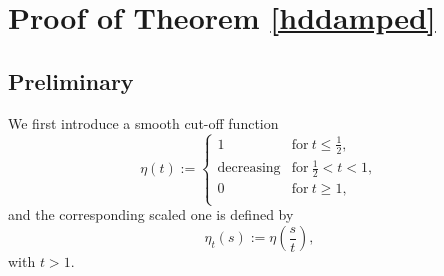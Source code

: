 \documentclass[review]{elsarticle}
\begin{document}
\section{Proof of Theorem \ref{hddamped}}
\subsection{Preliminary}
We first introduce a smooth cut-off function
\[
\eta(t):=
 \left\{
 \begin{array}{cl}
 1 & \mbox{for}\ t\le\frac12,\\
 \mbox{decreasing} & \mbox{for}\ \frac12<t<1,\\
 0 & \mbox{for}\ t\ge 1,\\
 \end{array}
 \right.
\]
and the corresponding scaled one is defined by
\begin{equation}
\label{scf}
 \eta_t(s):=\eta\left(\frac st\right),
\end{equation}
with $t>1$.
\end{document}
